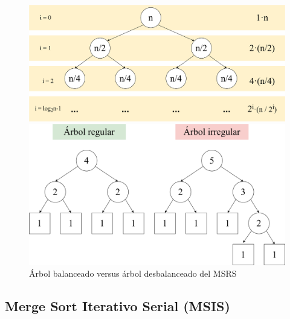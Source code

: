 \documentclass[titlepage]{article}
\begin{document}
\begin{figure}[h]
\centering 
\captionsetup{justification=centering, margin=10pt}
\begin{minipage}{0.5\textwidth} 
    \centering 
    \includegraphics[width=0.95\linewidth]{Diagrames/arbolBinarioLenght.png} 
    \caption{Tamaño de la entrada a lo largo de las llamadas a \lstinline{sort()}} 
    \label{fig:entradaMSRS}
\end{minipage}\hfill 
\begin{minipage}{0.5\textwidth} 
    \centering 
    \includegraphics[width=0.95\linewidth]{Diagrames/arbolBinario_MSRS.png} 
    \caption{Árbol balanceado versus árbol desbalanceado del MSRS} 
    \label{fig:simetriaMSRS}
\end{minipage} \end{figure}

\subsection{Merge Sort Iterativo Serial (MSIS)}
\end{document}
